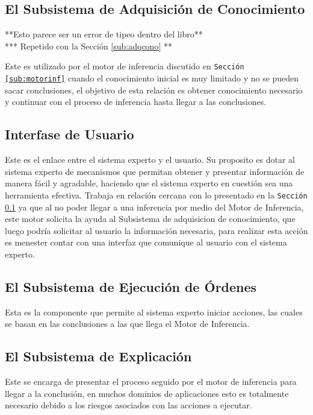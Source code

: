 \documentclass{article}
\begin{document}
\subsection{El Subsistema de Adquisici\'on de Conocimiento}
\label{sub:adqcono2}
\begin{center}
**Esto parece ser un error de tipeo dentro del libro**\\
*** Repetido con la Secci\'on \ref{sub:adqcono} **
\end{center}

Este es utilizado por el motor de inferencia discutido en \texttt{Secci\'on
\ref{sub:motorinf}} cuando el conocimiento inicial es muy limitado y no se
pueden sacar conclusiones, el objetivo de esta relaci\'on es obtener conocimiento
necesario y continuar con el proceso de inferencia hasta llegar a las conclusiones.

\subsection{Interfase de Usuario}
Este es el enlace entre el sistema experto y el usuario. Su proposito es dotar
al sistema experto de mecanismos que permitan obtener y presentar informaci\'on
de manera f\'acil y agradable, haciendo que el sistema experto en cuesti\'on
sea una herramienta efectiva. Trabaja en relaci\'on cercana con lo presentado en
la \texttt{Secci\'on \ref{sub:adqcono2}} ya que al no poder llegar a una
inferencia por medio del Motor de Inferencia, este motor solicita la ayuda al
Subsistema de adquisicion de conocimiento, que luego podr\'ia solicitar al
usuario la informaci\'on necesaria, para realizar esta acci\'on es menester
contar con una interfaz que comunique al usuario con el sistema experto.


\subsection{El Subsistema de Ejecuci\'on de \'Ordenes}
Esta es la componente que permite al  sistema experto iniciar acciones, las
cuales se basan en las conclusiones a las que llega el Motor de Inferencia.

\subsection{El Subsistema de Explicaci\'on}
Este se encarga de presentar el proceso seguido por el motor de inferencia para
llegar a la conclusi\'on, en muchos dominios de aplicaciones esto es totalmente
necesario debido a los riesgos asociados con las acciones a ejecutar.
\end{document}
